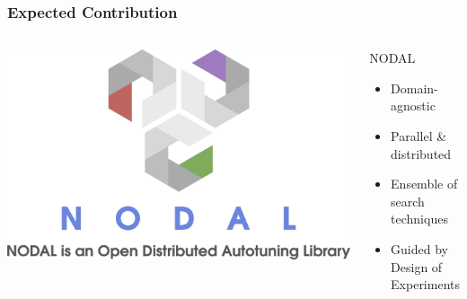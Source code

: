 \documentclass[10pt, compress, aspectratio=169]{beamer}
\begin{document}
\begin{frame}
    \frametitle{Expected Contribution}
    \begin{columns}[c]
        \begin{center}
            \includegraphics[width=\columnwidth]{logo}
        \end{center}

        \begin{block}{NODAL}
            \begin{itemize}
                \item \alert{Domain-agnostic}
                \item \alert{Parallel \& distributed}
                \item \alert{Ensemble} of search techniques
                \item Guided by \alert{Design of Experiments}
            \end{itemize}
        \end{block}

    \end{columns}
\end{frame}
\end{document}
